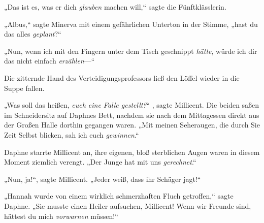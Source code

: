 „Das ist es, was er dich \emph{glauben} machen will,“ sagte die Fünftklässlerin.

\later

„Albus,“ sagte Minerva mit einem gefährlichen Unterton in der Stimme, „hast du das alles \emph{geplant}?“

\later

„Nun, wenn ich mit den Fingern unter dem Tisch geschnippt \emph{hätte}, würde ich dir das nicht einfach \emph{erzählen}—“

\later

Die zitternde Hand des Verteidigungsprofessors ließ den Löffel wieder in die Suppe fallen.

\later

„Was soll das heißen, \emph{euch eine Falle gestellt?}“ , sagte Millicent. Die beiden saßen im Schneidersitz auf Daphnes Bett, nachdem sie nach dem Mittagessen direkt aus der Großen Halle dorthin gegangen waren. „Mit meinen Seheraugen, die durch Sie Zeit Selbst blicken, sah ich euch \emph{gewinnen}.“

Daphne starrte Millicent an, ihre eigenen, bloß sterblichen Augen waren in diesem Moment ziemlich verengt. „Der Junge hat mit uns \emph{gerechnet}.“

„Nun, ja!“, sagte Millicent. „Jeder weiß, dass ihr Schäger jagt!“

„Hannah wurde von einem wirklich schmerzhaften Fluch getroffen,“ sagte Daphne. „Sie musste einen Heiler aufsuchen, Millicent! Wenn wir Freunde sind, hättest du mich \emph{vorwarnen} müssen!“

